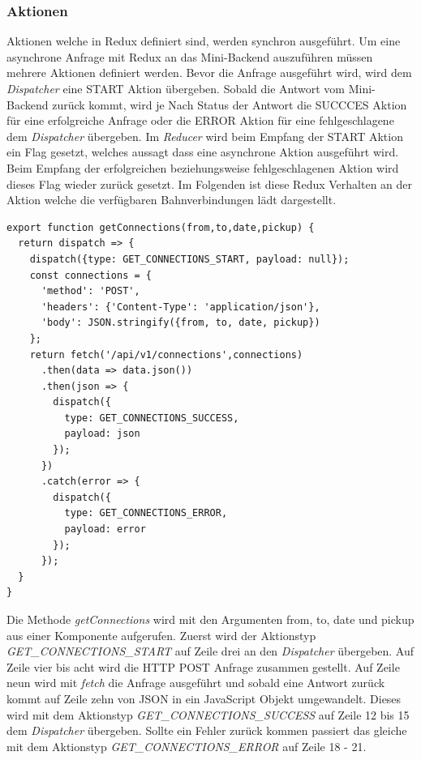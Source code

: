 \subsubsection{Aktionen}
Aktionen welche in Redux definiert sind, werden synchron ausgeführt. Um eine asynchrone Anfrage mit Redux an das Mini-Backend auszuführen müssen mehrere Aktionen definiert werden. Bevor die Anfrage ausgeführt wird, wird dem \textit{Dispatcher} eine START Aktion übergeben. Sobald die Antwort vom Mini-Backend zurück kommt, wird je Nach Status der Antwort die SUCCCES Aktion für eine erfolgreiche Anfrage oder die ERROR Aktion für eine fehlgeschlagene dem \textit{Dispatcher} übergeben. Im \textit{Reducer} wird beim Empfang der START Aktion ein Flag gesetzt, welches aussagt dass eine asynchrone Aktion ausgeführt wird. Beim Empfang der erfolgreichen beziehungsweise fehlgeschlagenen Aktion wird dieses Flag wieder zurück gesetzt. Im Folgenden ist diese Redux Verhalten an der Aktion welche die verfügbaren Bahnverbindungen lädt dargestellt.

\begin{lstlisting}[caption=Aktion getConnections]
export function getConnections(from,to,date,pickup) {
  return dispatch => {
    dispatch({type: GET_CONNECTIONS_START, payload: null});
    const connections = {
      'method': 'POST',
      'headers': {'Content-Type': 'application/json'},
      'body': JSON.stringify({from, to, date, pickup})
    };
    return fetch('/api/v1/connections',connections)
      .then(data => data.json())
      .then(json => {
        dispatch({
          type: GET_CONNECTIONS_SUCCESS,
          payload: json
        });
      })
      .catch(error => {
        dispatch({
          type: GET_CONNECTIONS_ERROR,
          payload: error
        });
      });
  }
}
\end{lstlisting}

Die Methode \textit{getConnections} wird mit den Argumenten from, to, date und pickup aus einer Komponente aufgerufen. Zuerst wird der Aktionstyp \textit{GET\_CONNECTIONS\_START} auf Zeile drei an den \textit{Dispatcher} übergeben. Auf Zeile vier bis acht wird die HTTP POST Anfrage zusammen gestellt. Auf Zeile neun wird mit \textit{fetch} die Anfrage ausgeführt und sobald eine Antwort zurück kommt auf Zeile zehn von JSON in ein JavaScript Objekt umgewandelt. Dieses wird mit dem Aktionstyp \textit{GET\_CONNECTIONS\_SUCCESS} auf Zeile 12 bis 15 dem \textit{Dispatcher} übergeben. Sollte ein Fehler zurück kommen passiert das gleiche mit dem Aktionstyp \textit{GET\_CONNECTIONS\_ERROR} auf Zeile 18 - 21.

